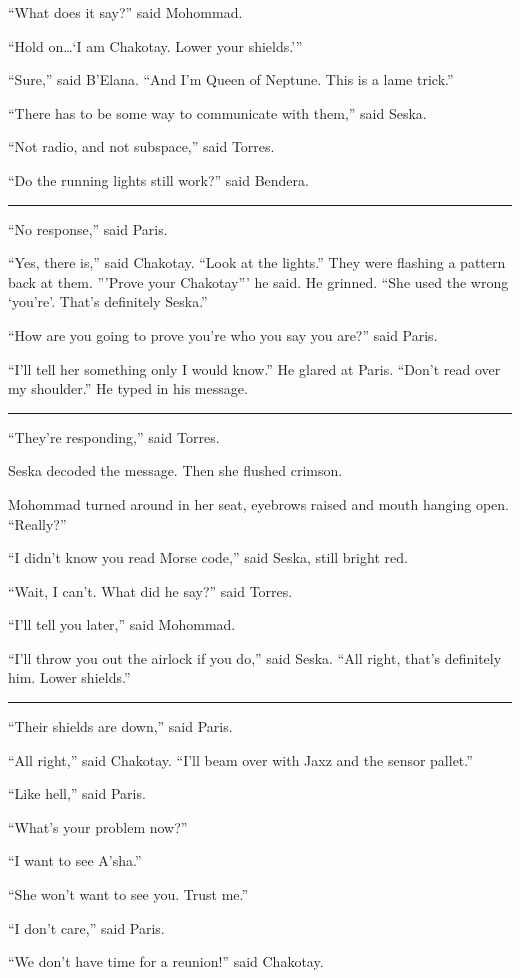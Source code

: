 \documentclass[twoside,letterpaper,12pt]{memoir}
\begin{document}
``What does it say?'' said Mohommad.

``Hold on\ldots `I am Chakotay. Lower your shields.'''

``Sure,'' said B'Elana. ``And I'm Queen of Neptune. This is a lame trick.''

``There has to be some way to communicate with them,'' said Seska.

``Not radio, and not subspace,'' said Torres.

``Do the running lights still work?'' said Bendera.

\fancybreak{\rule{3cm}{0.4 pt}}
``No response,'' said Paris.

``Yes, there is,'' said Chakotay. ``Look at the lights.'' They were flashing a pattern back at them. '''Prove your Chakotay''' he said. He grinned. ``She used the wrong `you're'. That's definitely Seska.''

``How are you going to prove you're who you say you are?'' said Paris.

``I'll tell her something only I would know.'' He glared at Paris. ``Don't read over my shoulder.'' He typed in his message.

\fancybreak{\rule{3cm}{0.4 pt}}
``They're responding,'' said Torres.

Seska decoded the message. Then she flushed crimson.

Mohommad turned around in her seat, eyebrows raised and mouth hanging open. ``Really?''

``I didn't know you read Morse code,'' said Seska, still bright red.

``Wait, I can't. What did he say?'' said Torres.

``I'll tell you later,'' said Mohommad.

``I'll throw you out the airlock if you do,'' said Seska. ``All right, that’s definitely him. Lower shields.''

\fancybreak{\rule{3cm}{0.4 pt}}
``Their shields are down,'' said Paris.

``All right,'' said Chakotay. ``I'll beam over with Jaxz and the sensor pallet.''

``Like hell,'' said Paris.

``What's your problem now?''

``I want to see A'sha.''

``She won't want to see you. Trust me.''

``I don't care,'' said Paris.

``We don't have time for a reunion!'' said Chakotay.
\end{document}
